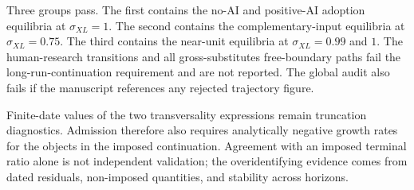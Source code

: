 Three groups pass. The first contains the no-AI and positive-AI adoption
equilibria at \(\sigma_{XL}=1\). The second contains the complementary-input
equilibria at \(\sigma_{XL}=0.75\). The third contains the near-unit equilibria
at \(\sigma_{XL}=0.99\) and \(1\). The human-research transitions and all
gross-substitutes free-boundary paths fail the long-run-continuation requirement and are not
reported. The global audit also fails if the manuscript references any rejected
trajectory figure.

Finite-date values of the two transversality expressions remain truncation
diagnostics. Admission therefore also requires analytically negative growth
rates for the objects in the imposed continuation. Agreement with an imposed terminal
ratio alone is not independent validation; the overidentifying evidence comes
from dated residuals, non-imposed quantities, and stability across horizons.

